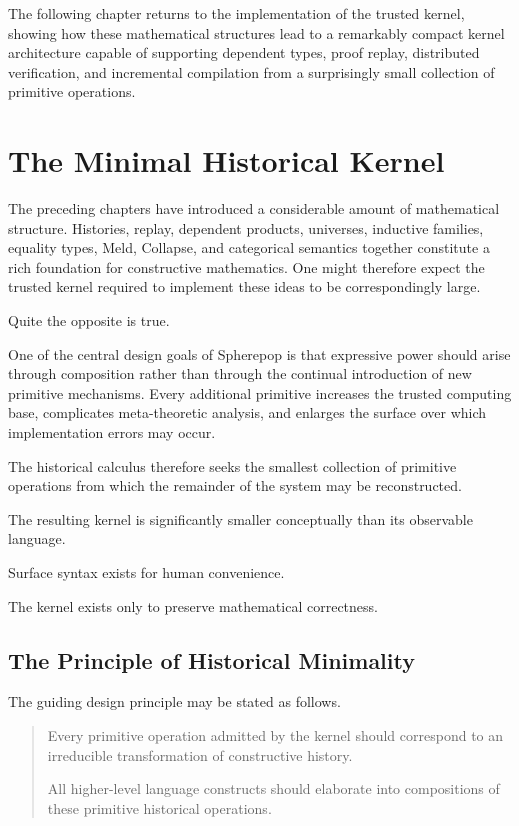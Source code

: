 \documentclass[12pt,oneside]{article}
\theoremstyle{definition}
\theoremstyle{remark}
\begin{document}
The following chapter returns to the implementation of the trusted kernel,
showing how these mathematical structures lead to a remarkably compact kernel
architecture capable of supporting dependent types, proof replay, distributed
verification, and incremental compilation from a surprisingly small collection
of primitive operations.

\section{The Minimal Historical Kernel}

The preceding chapters have introduced a considerable amount of mathematical
structure. Histories, replay, dependent products, universes, inductive
families, equality types, Meld, Collapse, and categorical semantics together
constitute a rich foundation for constructive mathematics. One might therefore
expect the trusted kernel required to implement these ideas to be
correspondingly large.

Quite the opposite is true.

One of the central design goals of Spherepop is that expressive power should
arise through composition rather than through the continual introduction of new
primitive mechanisms. Every additional primitive increases the trusted
computing base, complicates meta-theoretic analysis, and enlarges the surface
over which implementation errors may occur.

The historical calculus therefore seeks the smallest collection of primitive
operations from which the remainder of the system may be reconstructed.

The resulting kernel is significantly smaller conceptually than its observable
language.

Surface syntax exists for human convenience.

The kernel exists only to preserve mathematical correctness.

\subsection{The Principle of Historical Minimality}

The guiding design principle may be stated as follows.

\begin{quote}

Every primitive operation admitted by the kernel should correspond to an
irreducible transformation of constructive history.

All higher-level language constructs should elaborate into compositions of these
primitive historical operations.

\end{quote}
\end{document}
